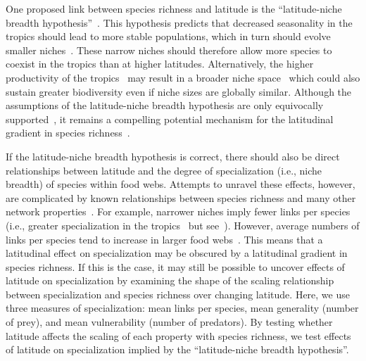 \documentclass[12pt]{article}
\begin{document}
\begin{spacing}{1.0}


  One proposed link between species richness and latitude is the ``latitude-niche breadth hypothesis''~\citep{Vazquez2004}. 
  This hypothesis predicts that decreased seasonality in the tropics should lead to more stable populations, which in
  turn should evolve smaller niches~\citep{Vazquez2004}. These narrow niches should therefore allow more species to 
  coexist in the tropics than at higher latitudes. Alternatively, the higher productivity of the tropics~\citep{Brown2004}
  may result in a broader niche space~\citep{Davies2007} which could also sustain greater biodiversity even if niche 
  sizes are globally similar. Although the assumptions of the latitude-niche breadth hypothesis are only equivocally 
  supported~\citep{Vazquez2004}, it remains a compelling potential mechanism for the latitudinal gradient in species 
  richness~\citep{Lappalainen2006,Krasnov2008,Slove2010}. 


  If the latitude-niche breadth hypothesis is correct, there should also be direct relationships between latitude and the
  degree of specialization (i.e., niche breadth) of species within food webs.
  Attempts to unravel these effects, however,
  are complicated by known relationships between species richness and many other network properties~\citep{Riede2010}. 
  For example,
  narrower niches imply fewer links per species (i.e., greater specialization in the tropics~\citep{Dyer2007,Marra1997} but see~\citep{Schleuning2012}). However,
  average numbers of links per species tend to increase in larger food webs~\citep{Dunne2006,Riede2010}. This means
  that a latitudinal effect on specialization may be obscured by a latitudinal gradient in species richness. If this is
  the case, it may still be possible to uncover effects of latitude on specialization by examining the shape of the scaling 
  relationship between specialization and species richness over changing latitude. Here, we use three measures of specialization:
  mean links per species, mean generality (number of prey), and mean vulnerability (number of predators). By testing whether
  latitude affects the scaling of each property with species richness, we test effects of latitude on specialization implied by
  the ``latitude-niche breadth hypothesis''.



\end{spacing}
\end{document}
